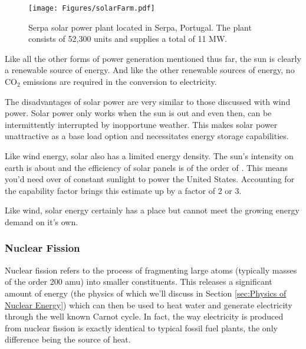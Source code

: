 		 \begin{figure}[h!]
		 	\centering
		 	\texttt{[image: Figures/solarFarm.pdf]}
		 	\caption[Serpa solar power plant]{Serpa solar power plant located in Serpa, Portugal. The plant consists of 52,300 units and supplies a total of 11 MW. \cite{noauthor_portugal_2006, Image_SolarFarm}}
		 \end{figure}
	 
	 	Like all the other forms of power generation mentioned thus far, the sun is clearly a renewable source of energy. And like the other renewable sources of energy, no CO$_2$ emissions are required in the conversion to electricity. 
	 	
	 	The disadvantages of solar power are very similar to those discussed with wind power. Solar power only works when the sun is out and even then, can be intermittently interrupted by inopportune weather. \cite{bibid} This makes solar power unattractive as a base load option and necessitates energy storage capabilities. 
	 	
	 	Like wind energy, solar also has a limited energy density. The sun's intensity on earth is about  and the efficiency of solar panels is of the order of . \cite{bibid} This means you'd need over  of constant sunlight to power the United States. Accounting for the capability factor brings this estimate up by a factor of 2 or 3. 
	
		Like wind, solar energy certainly has a place but cannot meet the growing energy demand on it's own.
	
	\subsubsection{Nuclear Fission}
	
		Nuclear fission refers to the process of fragmenting large atoms (typically masses of the order 200 amu) into smaller constituents. \cite{bibid} This releases a significant amount of energy (the physics of which we'll discuss in Section \ref{sec:Physics of Nuclear Energy}) which can then be used to heat water and generate electricity through the well known Carnot cycle. \cite{bibid} In fact, the way electricity is produced from nuclear fission is exactly identical to typical fossil fuel plants, the only difference being the source of heat.
		
